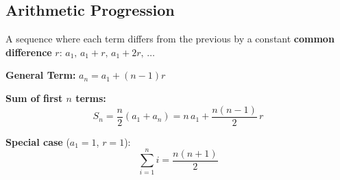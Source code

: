 \subsection{Arithmetic Progression}

A sequence where each term differs from the previous by a constant \textbf{common difference} $r$: $a_1,\, a_1+r,\, a_1+2r,\, \ldots$

\textbf{General Term:} $a_n = a_1 + (n-1)r$

\textbf{Sum of first $n$ terms:}
\[ S_n = \frac{n}{2}(a_1 + a_n) = n\,a_1 + \frac{n(n-1)}{2}\,r \]

\textbf{Special case} ($a_1 = 1$, $r = 1$):
\[ \sum_{i=1}^{n} i = \frac{n(n+1)}{2} \]
